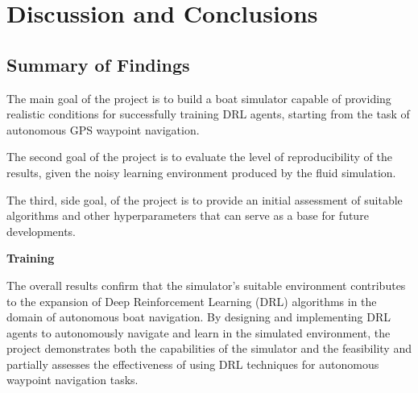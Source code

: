 \section{Discussion and Conclusions }


\subsection{Summary of Findings}


\begin{textblock}
The main goal of the project is to build a boat simulator capable of providing realistic conditions for successfully training DRL agents, starting from the task of autonomous GPS waypoint navigation. 

The second goal of the project is to evaluate the level of reproducibility of the results, given the noisy learning environment produced by the fluid simulation.

The third, side goal, of the project is to provide an initial assessment of suitable algorithms and other hyperparameters that can serve as a base for future developments.
\end{textblock}



\begin{textblock}
{\bf Training }

The overall results confirm that the simulator's suitable environment   contributes to the expansion of Deep Reinforcement Learning (DRL) algorithms in the domain of autonomous boat navigation. By designing and implementing DRL agents to autonomously navigate and learn in the simulated environment, the project demonstrates both the capabilities of the simulator and the feasibility and partially assesses the effectiveness of using DRL techniques for autonomous waypoint navigation tasks.
\end{textblock}




